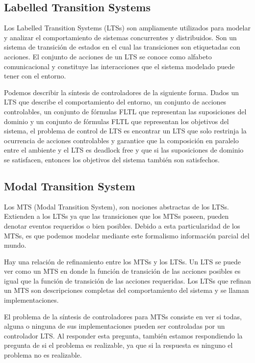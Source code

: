 \subsection{Labelled Transition Systems}
Los Labelled Transition Systems (LTSs) son ampliamente utilizados para modelar y analizar el comportamiento de sistemas concurrentes y distribuidos. Son un sistema de transición de estados en el cual las transiciones son etiquetadas con acciones. El conjunto de acciones de un LTS se conoce como alfabeto comunicacional y constituye las interacciones que el sistema modelado puede tener con el entorno.

\vspace{\baselineskip}
Podemos describir la síntesis de controladores de la siguiente forma. Dados un LTS que describe el comportamiento del entorno, un conjunto de acciones controlables, un conjunto de fórmulas FLTL que representan las suposiciones del dominio y un conjunto de fórmulas FLTL que representan los objetivos del sistema, el problema de control de LTS es encontrar un LTS que solo restrinja la ocurrencia de acciones controlables y garantice que la composición en paralelo entre el ambiente y el LTS es deadlock free y que si las suposiciones de dominio se satisfacen, entonces los objetivos del sistema también son satisfechos.

\subsection{Modal Transition System}
Los MTS (Modal Transition System), son nociones abstractas de los LTSs. Extienden a los LTSs ya que las transiciones 
que los MTSs poseen, pueden denotar eventos requeridos o bien posibles. Debido a esta particularidad de los MTSs, es 
que podemos modelar mediante este formalismo información parcial del mundo.

\vspace{\baselineskip}
Hay una relación de refinamiento entre los MTSs y los LTSs. Un LTS se puede ver como un MTS en donde la función de
transición de las acciones posibles es igual que la función de transición de las acciones requeridas. Los LTSs que
refinan un MTS son descripciones completas del comportamiento del sistema y se llaman implementaciones.

\vspace{\baselineskip}
El problema de la síntesis de controladores para MTSs consiste en ver si todas, alguna o ninguna de sus implementaciones pueden ser controladas por un controlador LTS. Al responder esta pregunta, también estamos respondiendo la pregunta de si el problema es realizable, ya que si la respuesta es ninguno el problema no es realizable.

